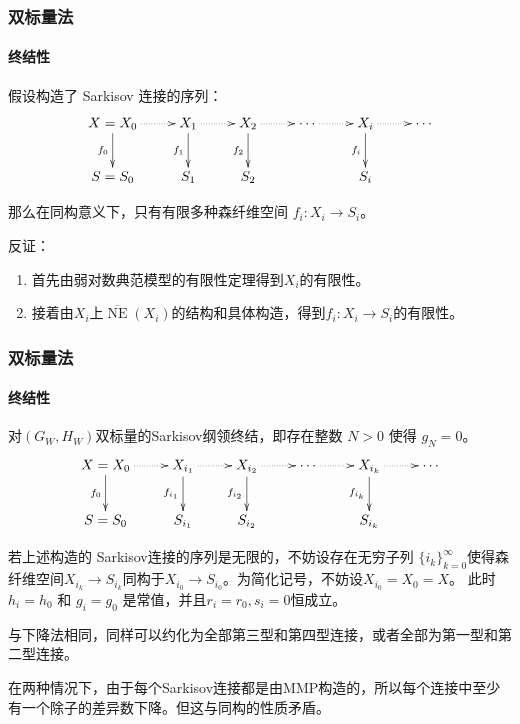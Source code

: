 \documentclass[10pt]{ctexbeamer}
\begin{document}
\begin{frame}[shrink]
  \frametitle{双标量法}
  \framesubtitle{终结性}

  假设构造了 Sarkisov 连接的序列：
  \[ \xymatrix{
    X=X_0\ar@{.>}[r]\ar[d]_{f_0}&X_{1}\ar@{.>}[r]\ar[d]_{f_1}& X_{2}\ar[d]_{f_2}\ar@{.>}[r] &\cdots\ar@{.>}[r]&X_{i}\ar[d]_{f_i}\ar@{.>}[r] &\cdots\\
    S=S_{0}&S_{1} &S_{2}&&S_{i}
    } \]

  那么在同构意义下，只有有限多种森纤维空间 $f_{i}:X_{i}\to S_{i}$。


  \pause
  反证：
\begin{enumerate}
  \pause
  \item 
  首先由弱对数典范模型的有限性定理得到$X_{i}$的有限性。
  \pause
  \item 
  接着由$X_{i}$上$ \overline{\operatorname{NE}}(X_{i})$的结构和具体构造，得到$f_{i}:X_{i}\to S_{i} $的有限性。 
\end{enumerate}

\end{frame}

\begin{frame}[shrink]
  \frametitle{双标量法}
  \framesubtitle{终结性}
    对$(G_{W},H_{W})$双标量的Sarkisov纲领终结，即存在整数 $N>0$ 使得 $g_{N}=0$。
  \[ \xymatrix{
    X=X_0\ar@{.>}[r]\ar[d]_{f_0} & X_{i_{1}}\ar@{.>}[r]\ar[d]_{f_{i_{1}}} & X_{i_{2}}\ar[d]_{f_{i_{2}}}\ar@{.>}[r] & \cdots\ar@{.>}[r] & X_{i_{k}}\ar[d]_{f_{i_{k}}}\ar@{.>}[r] & \cdots\\
    S=S_{0}                      & S_{i_{1}}                              & S_{i_{2}}                              &                   & S_{i_{k}}
    } \]

  \pause
    若上述构造的 Sarkisov连接的序列是无限的，不妨设存在无穷子列 $\{i_{k}\}_{k=0}^{\infty} $使得森纤维空间$X_{i_{k}}\to S_{i_{k}}$同构于$X_{i_{0}}\to S_{i_{0}}$。为简化记号，不妨设$X_{i_{0}}=X_{0}=X$。 
    此时$h_{i}=h_{0}$ 和  $g_{i}=g_{0}$ 是常值，并且$r_{i}=r_{0},s_{i}=0$恒成立。

  \pause
    与下降法相同，同样可以约化为全部第三型和第四型连接，或者全部为第一型和第二型连接。

  \pause
    在两种情况下，由于每个Sarkisov连接都是由MMP构造的，所以每个连接中至少有一个除子的差异数下降。但这与同构的性质矛盾。
\end{frame}
\end{document}
